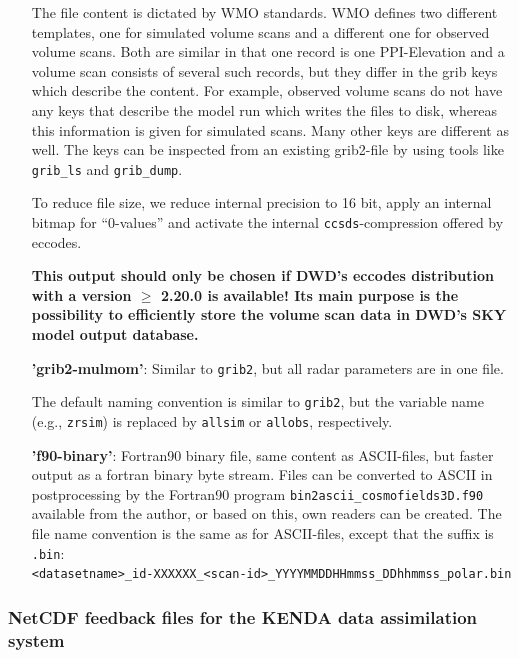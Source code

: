 \documentclass[10pt,a4paper,twoside,headinclude,footinclude,parskip=half]{scrartcl}
\newcommand{\myaktuellesection}{sec:intro}%
\newcommand{\labelsec}[1]{\label{#1}\renewcommand{\myaktuellesection}{#1}}%
\newcommand{\labelsec}[1]{\label{#1}}%
\newcommand{\srcform}[1]{\mbox{\texttt{#1}}\xspace}%
\begin{document}
\begin{itemize}
    The file content is dictated by WMO standards. WMO defines two different templates, one for simulated volume scans and a different one for observed volume scans.
    Both are similar in that one record is one PPI-Elevation and a volume scan consists of several such records, but they differ in the grib keys which describe the content.
    For example, observed volume scans do not have any keys that describe the model run which writes the files to disk, whereas this information is given for simulated scans.
    Many other keys are different as well. The keys can be inspected from an existing grib2-file by using tools like \srcform{grib_ls} and \srcform{grib_dump}.

    To reduce file size, we reduce internal precision to 16 bit, apply an internal bitmap for ``0-values'' and activate the internal \srcform{ccsds}-compression offered by eccodes.
    
    \textbf{This output should only be chosen if DWD's eccodes distribution with a version $\ge$ 2.20.0 is available! Its main purpose is the possibility to efficiently store the volume scan data in DWD's SKY model output database.}
  \item[\textbf{'grib2-mulmom'}:] Similar to \srcform{grib2}, but all radar parameters are in one file.

    The default naming convention is similar to \srcform{grib2}, but the variable name (e.g., \verb|zrsim|) is replaced by \verb|allsim| or \verb|allobs|, respectively.
  \item[\textbf{'f90-binary'}:] Fortran90 binary file, same content as ASCII-files, but faster output as a fortran binary byte stream.
    Files can be converted to ASCII in postprocessing by
    the Fortran90 program \srcform{bin2ascii_cosmofields3D.f90} available from the author, or based on this, own readers can be created.
    The file name convention is the same as for ASCII-files, except that the suffix is \verb|.bin|:\\[0.5em]
    \verb|<datasetname>_id-XXXXXX_<scan-id>_YYYYMMDDHHmmss_DDhhmmss_polar.bin|\\[0.5em]
  \end{itemize}


\subsubsection{NetCDF feedback files for the KENDA data assimilation system}

\labelsec{sec:output:format:fof}
\end{document}
